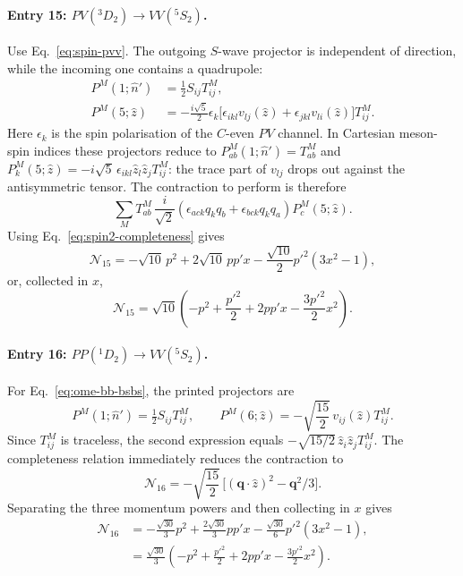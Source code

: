 \paragraph{Entry 15: $PV({}^3D_2)\to VV({}^5S_2)$.}
Use Eq.~\eqref{eq:spin-pvv}. The outgoing $S$-wave projector is independent
of direction, while the incoming one contains a quadrupole:
\begin{equation}
\begin{split}
 P^M(1;\hat n')&=\tfrac12 S_{ij}T^M_{ij},\\
 P^M(5;\hat z)&=-\frac{i\sqrt5}{2}\epsilon_k
 \bigl[\epsilon_{ikl}v_{lj}(\hat z)
 +\epsilon_{jkl}v_{li}(\hat z)\bigr]T^M_{ij}.
\end{split}
\label{eq:worked-pv-projector}
\end{equation}
Here $\epsilon_k$ is the spin polarisation of the $C$-even $PV$ channel.
In Cartesian meson-spin indices these projectors reduce to
$P^M_{ab}(1;\hat n')=T^M_{ab}$ and
$P^M_k(5;\hat z)=-i\sqrt5\,\epsilon_{ikl}\hat z_l\hat z_jT^M_{ij}$:
the trace part of $v_{lj}$ drops out against the antisymmetric tensor.
The contraction to perform is therefore
\begin{equation}
 \sum_M T^M_{ab}\,
 \frac{i}{\sqrt2}(\epsilon_{ack}q_kq_b+
 \epsilon_{bck}q_kq_a)P_c^M(5;\hat z).
\end{equation}
Using Eq.~\eqref{eq:spin2-completeness} gives
\begin{equation}
 \mathcal N_{15}=-\sqrt{10}\,p^2+2\sqrt{10}\,pp'x
 -\frac{\sqrt{10}}2p'^2(3x^2-1),
\end{equation}
or, collected in $x$,
\begin{equation}
 \mathcal N_{15}=\sqrt{10}\left(-p^2+\frac{p'^2}{2}
 +2pp'x-\frac{3p'^2}{2}x^2\right).
\end{equation}

\paragraph{Entry 16: $PP({}^1D_2)\to VV({}^5S_2)$.}
For Eq.~\eqref{eq:ome-bb-bsbs}, the printed projectors are
\begin{equation}
 P^M(1;\hat n')=\tfrac12 S_{ij}T^M_{ij},\qquad
 P^M(6;\hat z)=-\sqrt{\frac{15}{2}}\,v_{ij}(\hat z)T^M_{ij}.
\end{equation}
Since $T^M_{ij}$ is traceless, the second expression equals
$-\sqrt{15/2}\,\hat z_i\hat z_jT^M_{ij}$. The completeness relation
immediately reduces the contraction to
\begin{equation}
 \mathcal N_{16}=-\sqrt{\frac{15}{2}}\,
 \bigl[(\bm q\cdot\hat z)^2-\bm q^2/3\bigr].
\end{equation}
Separating the three momentum powers and then collecting in $x$ gives
\begin{align}
 \mathcal N_{16}&=-\frac{\sqrt{30}}3p^2
 +\frac{2\sqrt{30}}3pp'x-\frac{\sqrt{30}}6p'^2(3x^2-1),\\
 &=\frac{\sqrt{30}}3
 \left(-p^2+\frac{p'^2}{2}+2pp'x-\frac{3p'^2}{2}x^2\right).
\end{align}

